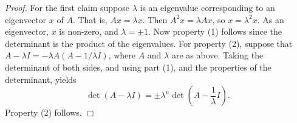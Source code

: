 \documentclass[12pt]{article}
\begin{document}
\emph{Proof.} For the first claim suppose $\lambda$ is an eigenvalue
corresponding to an eigenvector $x$ of $A$. That is, $Ax = \lambda x$.
Then $A^2x = \lambda Ax$, so $x=\lambda^2x$. As an eigenvector, $x$ is non-zero, and
 $\lambda = \pm 1$. Now property (1) follows since the determinant is
the product of the eigenvalues. For property (2), suppose that
$A-\lambda I = -\lambda A(A-1/\lambda I)$, where $A$ and $\lambda$ are as above.
Taking the determinant of both
sides, and using part (1), and the properties of the determinant, yields
 $$ \det (A-\lambda I) = \pm \lambda^n \det(A-\frac{1}{\lambda} I).$$
Property (2) follows.
$\Box$
\end{document}
